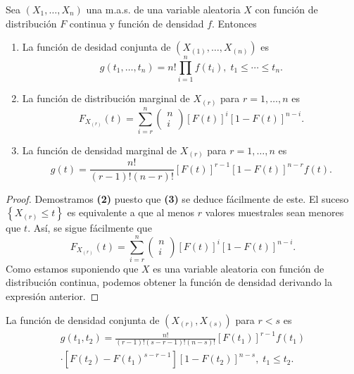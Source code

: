 \begin{prop}
Sea $\displaystyle \left(X_{1}, \ldots, X_{n}\right) $ una m.a.s. de una variable aleatoria $\displaystyle X $ con función de distribución $\displaystyle F $ continua y función de densidad $\displaystyle f $. Entonces
\begin{enumerate}
\item La función de desidad conjunta de $\displaystyle \left(X_{\left(1\right)}, \ldots, X_{\left(n\right)}\right) $ es
	\[g\left(t_{1}, \ldots, t_{n}\right)=n!\prod^{n}_{i=1}f\left(t_{i}\right), \; t_{1}\leq \cdots \leq t_{n} .\]
\item La función de distribución marginal de $\displaystyle X_{\left(r\right)} $ para $\displaystyle r = 1, \ldots, n $ es
	\[F_{X_{\left(r\right)}}\left(t\right)=\sum^{n}_{i=r}\begin{pmatrix} n \\ i \end{pmatrix}\left[F\left(t\right)\right] ^{i}\left[1-F\left(t\right)\right] ^{n-i} .\]
\item La función de densidad marginal de $\displaystyle X_{\left(r\right)} $ para $\displaystyle r = 1, \ldots, n $ es
	\[g\left(t\right)=\frac{n!}{\left(r-1\right)!\left(n-r\right)!}\left[F\left(t\right)\right] ^{r-1}\left[1 - F\left(t\right)\right] ^{n-r}f\left(t\right) .\]
\end{enumerate}
\end{prop}
\begin{proof}
	Demostramos \textbf{(2)} puesto que \textbf{(3)} se deduce fácilmente de este. El suceso $\displaystyle \left\{ X_{\left(r\right)} \leq t\right\}  $ es equivalente a que al menos $\displaystyle r $ valores muestrales sean menores que $\displaystyle t $. Así, se sigue fácilmente que
	\[F_{X_{\left(r\right)}}\left(t\right) =\sum^{n}_{i= r}\begin{pmatrix} n \\ i \end{pmatrix}\left[F\left(t\right)\right] ^{i}\left[1-F\left(t\right)\right] ^{n-i}.\]
	Como estamos suponiendo que $\displaystyle X $ es una variable aleatoria con función de distribución continua, podemos obtener la función de densidad derivando la expresión anterior. 
\end{proof}
\begin{prop}
La función de densidad conjunta de $\displaystyle \left(X_{\left(r\right)}, X_{\left(s\right)}\right) $ para $\displaystyle r < s $ es
\[
\begin{split}
 g\left(t_{1}, t_{2}\right)=\frac{n!}{\left(r-1\right)!\left(s-r-1\right)!\left(n-s\right)!}\left[F\left(t_{1}\right)\right] ^{r-1}f\left(t_{1}\right) \\
 \cdot \left[F\left(t_{2}\right)-F\left(t_{1}\right)^{s-r-1}\right] \left[1-F\left(t_{2}\right)\right] ^{n-s}, \; t_{1}\leq t_{2}.
\end{split}
\]
\end{prop}
